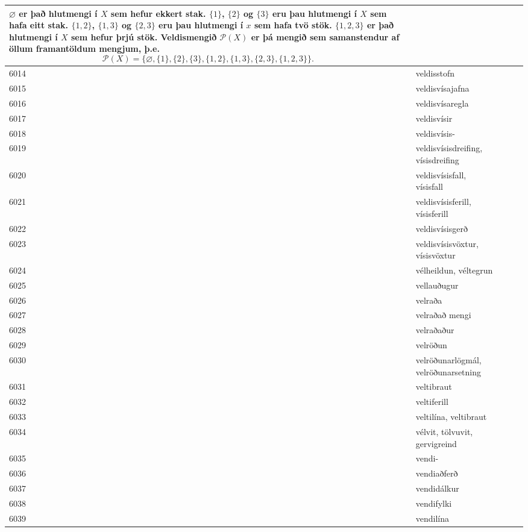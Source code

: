 \begin{longtable}{p{}|p{}|p{}|p{}|p{}}
$\varnothing$ er það hlutmengi í $X$ sem hefur ekkert stak.
$\{1\}$, $\{2\}$ og $\{3\}$ eru þau hlutmengi í $X$ sem hafa eitt stak.
$\{1,2\}$, $\{1,3\}$ og $\{2,3\}$ eru þau hlutmengi í $x$ sem hafa tvö stök.
$\{1,2,3\}$ er það hlutmengi í $X$ sem hefur þrjú stök.
Veldismengið $\mathcal{P}(X)$ er þá mengið sem samanstendur af öllum framantöldum mengjum, þ.e. \[ \mathcal{P}(X) = \{ \varnothing,\{1\},\{2\},\{3\},\{1,2\},\{1,3\},\{2,3\},\{1,2,3\} \}. \] &  \\
\hline
6014 & veldisstofn &  &  &  \\
\hline
6015 & veldisvísajafna &  &  &  \\
\hline
6016 & veldisvísaregla &  &  &  \\
\hline
6017 & veldisvísir &  &  &  \\
\hline
6018 & veldisvísis- &  &  &  \\
\hline
6019 & veldisvísisdreifing, vísisdreifing &  &  &  \\
\hline
6020 & veldisvísisfall, vísisfall &  &  &  \\
\hline
6021 & veldisvísisferill, vísisferill &  &  &  \\
\hline
6022 & veldisvísisgerð &  &  &  \\
\hline
6023 & veldisvísisvöxtur, vísisvöxtur &  &  &  \\
\hline
6024 & vélheildun, véltegrun &  &  &  \\
\hline
6025 & vellauðugur &  &  &  \\
\hline
6026 & velraða &  &  &  \\
\hline
6027 & velraðað mengi &  &  &  \\
\hline
6028 & velraðaður &  &  &  \\
\hline
6029 & velröðun &  &  &  \\
\hline
6030 & velröðunarlögmál, velröðunarsetning &  &  &  \\
\hline
6031 & veltibraut &  &  &  \\
\hline
6032 & veltiferill &  &  &  \\
\hline
6033 & veltilína, veltibraut &  &  &  \\
\hline
6034 & vélvit, tölvuvit, gervigreind &  &  &  \\
\hline
6035 & vendi- &  &  &  \\
\hline
6036 & vendiaðferð &  &  &  \\
\hline
6037 & vendidálkur &  &  &  \\
\hline
6038 & vendifylki &  &  &  \\
\hline
6039 & vendilína &  &  &  \\

\end{longtable}
